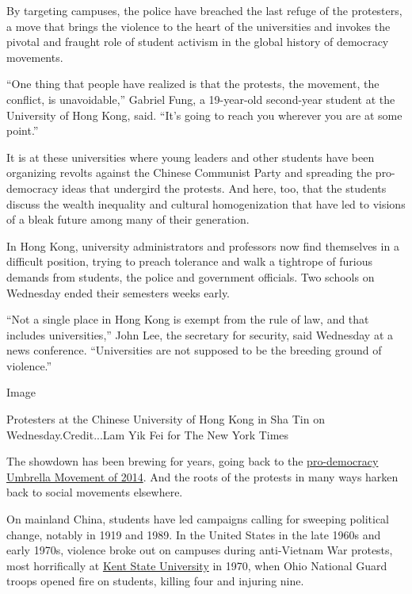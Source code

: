 By targeting campuses, the police have breached the last refuge of the
protesters, a move that brings the violence to the heart of the
universities and invokes the pivotal and fraught role of student
activism in the global history of democracy movements.

``One thing that people have realized is that the protests, the
movement, the conflict, is unavoidable,'' Gabriel Fung, a 19-year-old
second-year student at the University of Hong Kong, said. ``It's going
to reach you wherever you are at some point.''

It is at these universities where young leaders and other students have
been organizing revolts against the Chinese Communist Party and
spreading the pro-democracy ideas that undergird the protests. And here,
too, that the students discuss the wealth inequality and cultural
homogenization that have led to visions of a bleak future among many of
their generation.

In Hong Kong, university administrators and professors now find
themselves in a difficult position, trying to preach tolerance and walk
a tightrope of furious demands from students, the police and government
officials. Two schools on Wednesday ended their semesters weeks early.

``Not a single place in Hong Kong is exempt from the rule of law, and
that includes universities,'' John Lee, the secretary for security, said
Wednesday at a news conference. ``Universities are not supposed to be
the breeding ground of violence.''

Image

Protesters at the Chinese University of Hong Kong in Sha Tin on
Wednesday.Credit...Lam Yik Fei for The New York Times

The showdown has been brewing for years, going back to the
\href{https://www.nytimes3xbfgragh.onion/2014/10/08/world/asia/hong-kong-people-looking-in-mirror-see-fading-chinese-identity.html}{pro-democracy
Umbrella Movement of 2014}. And the roots of the protests in many ways
harken back to social movements elsewhere.

On mainland China, students have led campaigns calling for sweeping
political change, notably in 1919 and 1989. In the United States in the
late 1960s and early 1970s, violence broke out on campuses during
anti-Vietnam War protests, most horrifically at
\href{https://www.nytimes3xbfgragh.onion/1970/05/05/archives/4-kent-state-students-killed-by-troops-8-hurt-as-shooting-follows.html}{Kent
State University} in 1970, when Ohio National Guard troops opened fire
on students, killing four and injuring nine.

